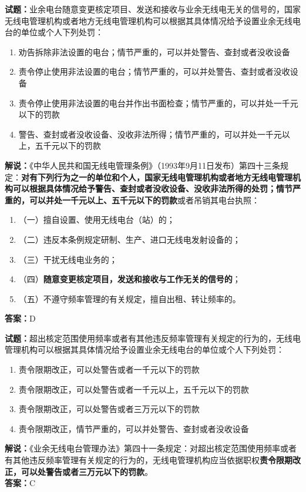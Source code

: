 \documentclass{ctexbook}
\begin{document}
\noindent\textbf{试题：}业余电台随意变更核定项目、发送和接收与业余无线电无关的信号的，国家无线电管理机构或者地方无线电管理机构可以根据其具体情况给予设置业余无线电台的单位或个人下列处罚：
\begin{enumerate}[leftmargin=3em]
  \item 劝告拆除非法设置的电台；情节严重的，可以并处警告、查封或者没收设备
  \item 责令停止使用非法设置的电台；情节严重的，可以并处警告、查封或者没收设备
  \item 责令停止使用非法设置的电台并作出书面检查；情节严重的，可以并处一千元以下的罚款
  \item 警告、查封或者没收设备、没收非法所得；情节严重的，可以并处一千元以上，五千元以下的罚款
\end{enumerate}
\noindent\textbf{解说：}《中华人民共和国无线电管理条例》（1993年9月11日发布）第四十三条规定：\textbf{对有下列行为之一的单位和个人，国家无线电管理机构或者地方无线电管理机构可以根据具体情况给予警告、查封或者没收设备、没收非法所得的处罚；情节严重的，可以并处一千元以上、五千元以下的罚款}或者吊销其电台执照：
\begin{enumerate}[leftmargin=3em, label=]
  \item（一）擅自设置、使用无线电台（站）的；
  \item（二）违反本条例规定研制、生产、进口无线电发射设备的；
  \item（三）干扰无线电业务的；
  \item（四）\textbf{随意变更核定项目，发送和接收与工作无关的信号的}；
  \item（五）不遵守频率管理的有关规定，擅自出租、转让频率的。
\end{enumerate}
\textbf{答案：}D

\vspace{\baselineskip}

\noindent\textbf{试题：}超出核定范围使用频率或者有其他违反频率管理有关规定的行为的，无线电管理机构可以根据其具体情况给予设置业余无线电台的单位或个人下列处罚：
\begin{enumerate}[leftmargin=3em]
  \item 责令限期改正，可以处警告或者一千元以下的罚款
  \item 责令限期改正，可以处警告或者一千元以上，五千元以下的罚款
  \item 责令限期改正，可以处警告或者三万元以下的罚款
  \item 责令限期改正，情节严重的，可以并处警告、查封或者没收设备
\end{enumerate}
\noindent\textbf{解说：}《业余无线电台管理办法》第四十一条规定：对超出核定范围使用频率或者有其他违反频率管理有关规定的行为的，无线电管理机构应当依据职权\textbf{责令限期改正，可以处警告或者三万元以下的罚款}。\\\textbf{答案：}C
\end{document}
